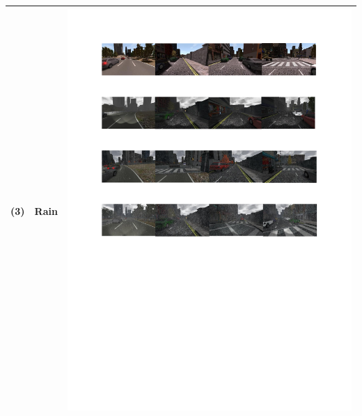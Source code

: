 \documentclass[a4paper,twoside]{article}
\begin{document}
\begin{table}[!t]
\begin{tabular}{|C{1cm}|c|C{11.5cm}|}
		(3)	& Rain &  \begin{minipage}{.9\textwidth}\includegraphics[scale=.7,trim=2cm 16.5cm 2cm 10.5cm,clip]{examples.pdf}\end{minipage} \\ \hline

\end{tabular}
\end{table}
\end{document}
